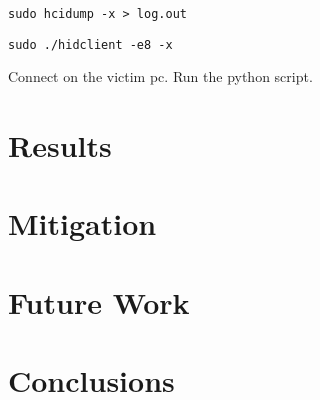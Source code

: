 \documentclass{acm_proc_article-sp}
\begin{document}
\begin{verbatim}
sudo hcidump -x > log.out
\end{verbatim}

\begin{verbatim}
sudo ./hidclient -e8 -x
\end{verbatim}

Connect on the victim pc.
Run the python script.

\section{Results}

\section{Mitigation}
\section{Future Work}
\section{Conclusions}

%


\balancecolumns
\end{document}

